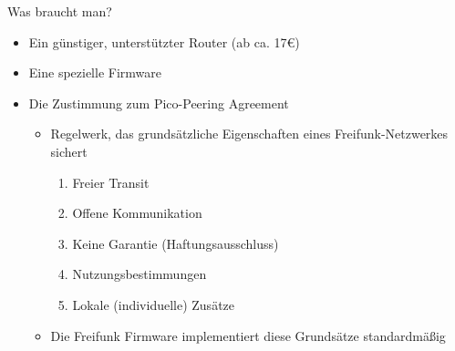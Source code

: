 \begin{frame}{Was braucht man?}
    \begin{itemize}
        \item Ein günstiger, unterstützter Router (ab ca. 17€)
        \item Eine spezielle Firmware
        \item Die Zustimmung zum \glqq{}Pico-Peering Agreement\grqq
        \begin{itemize}
            \item Regelwerk, das grundsätzliche Eigenschaften eines Freifunk-Netzwerkes sichert
            \begin{enumerate}
                \item Freier Transit
                \item Offene Kommunikation
                \item Keine Garantie (Haftungsausschluss)
                \item Nutzungsbestimmungen
                \item Lokale (individuelle) Zusätze
            \end{enumerate}
            \item Die Freifunk Firmware implementiert diese Grundsätze standardmäßig
        \end{itemize}
    \end{itemize}
\end{frame}

